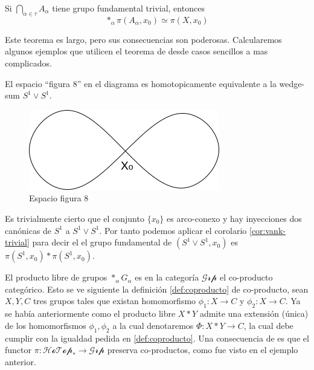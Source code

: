 \begin{corolario} \label{cor:vank-trivial}
  Si \(\bigcap_{\alpha \in \tau} A_\alpha \) tiene grupo fundamental
  trivial, entonces
  \[ *_\alpha \pi (A_\alpha , x_0) \simeq \pi (X, x_0) \]
\end{corolario}

Este teorema es largo, pero sus consecuencias son poderosas.
Calcularemos algunos ejemplos que utilicen el teorema de \vank desde
casos sencillos a mas complicados.

\begin{ejemplo}
El espacio ``figura 8'' en el diagrama es homotopicamente equivalente a
la wedge-sum \(S^1 \vee S^1\).
  \begin{figure}[h]
    \centering \includegraphics[scale=0.5]{./imagenes/figura8.png}
    \caption*{Espacio figura 8}
  \end{figure}
  Es trivialmente cierto que el conjunto \(\{x_0\}\) es arco-conexo y
  hay inyecciones dos canónicas de \(S^1\) a \(S^1 \vee S^1\). Por tanto
  podemos aplicar el corolario \ref{cor:vank-trivial} para decir el el
  grupo fundamental de \(\left( S^1 \vee S^1 , x_0 \right) \) es \(\pi
  \left( S^1 , x_0 \right) * \pi \left( S^1 , x_0 \right) \).
\end{ejemplo}

El producto libre de grupos \(*_\alpha G_\alpha\) es en la categoría
\(\mathcal{Grp}\) el co-producto categórico. Esto se ve siguiente la
definición \ref{def:coproducto} de co-producto, sean \(X,Y,C\) tres grupos
tales que existan homomorfismo \(\phi_1 : X \to C\) y \(\phi_2 : X \to
C\). Ya se había anteriormente como el producto libre \(X * Y\) admite
una extensión (única) de los homomorfismos \(\phi_1, \phi_2\) a la cual
denotaremos \(\Phi : X * Y \to C\), la cual debe cumplir con la igualdad
pedida en \ref{def:coproducto}. Una consecuencia de \vank es que el
functor \(\pi : \mathscr{HoTop}_* \to \mathscr{Grp}\) preserva
co-productos, como fue visto en el ejemplo anterior.

